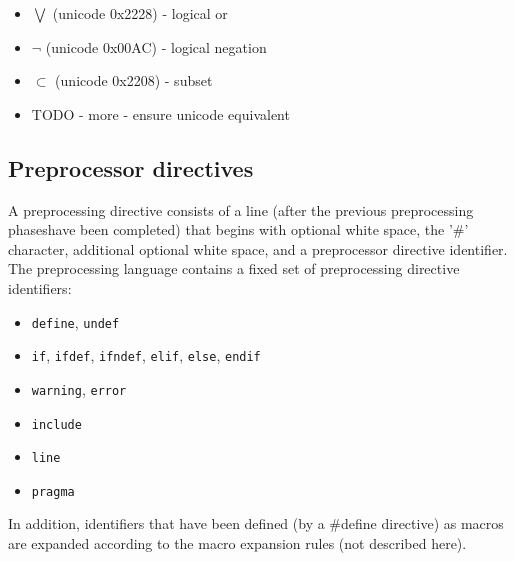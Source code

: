 \begin{itemize}
\begin{itemize}
		\item[] $\bigvee$ (unicode 0x2228) - logical or
		\item[] $\neg$ (unicode 0x00AC) - logical negation
		\item[] $\subset$ (unicode 0x2208) - subset
		\item TODO - more - ensure unicode equivalent
	\end{itemize}
\end{itemize}

\subsection{Preprocessor directives}
A preprocessing directive consists of a line (after the previous preprocessing phaseshave been completed) that begins with optional white space, the '\#' character, additional optional white space, and a preprocessor directive identifier.
The preprocessing language contains a fixed set of preprocessing directive identifiers:
\begin{itemize}
	\item \texttt{define}, \texttt{undef}
	\item \texttt{if}, \texttt{ifdef}, \texttt{ifndef}, \texttt{elif}, \texttt{else}, \texttt{endif}
	\item \texttt{warning}, \texttt{error}
	\item \texttt{include}
	\item \texttt{line}
	\item \texttt{pragma}
\end{itemize}
In addition, identifiers that have been defined (by a \#define directive) as macros are expanded according to the macro expansion rules (not described here).


